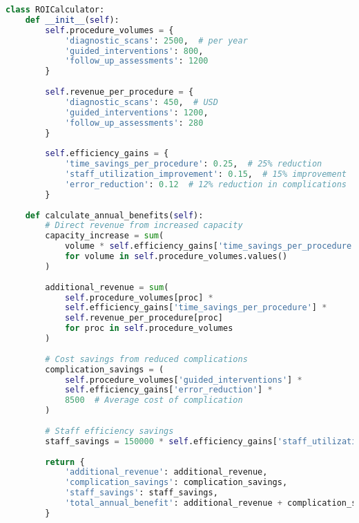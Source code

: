 \begin{lstlisting}[language=Python, caption={ROI Calculation Model}, label={lst:roi-calculation}]
class ROICalculator:
    def __init__(self):
        self.procedure_volumes = {
            'diagnostic_scans': 2500,  # per year
            'guided_interventions': 800,
            'follow_up_assessments': 1200
        }
        
        self.revenue_per_procedure = {
            'diagnostic_scans': 450,  # USD
            'guided_interventions': 1200,
            'follow_up_assessments': 280
        }
        
        self.efficiency_gains = {
            'time_savings_per_procedure': 0.25,  # 25% reduction
            'staff_utilization_improvement': 0.15,  # 15% improvement
            'error_reduction': 0.12  # 12% reduction in complications
        }
    
    def calculate_annual_benefits(self):
        # Direct revenue from increased capacity
        capacity_increase = sum(
            volume * self.efficiency_gains['time_savings_per_procedure']
            for volume in self.procedure_volumes.values()
        )
        
        additional_revenue = sum(
            self.procedure_volumes[proc] * 
            self.efficiency_gains['time_savings_per_procedure'] *
            self.revenue_per_procedure[proc]
            for proc in self.procedure_volumes
        )
        
        # Cost savings from reduced complications
        complication_savings = (
            self.procedure_volumes['guided_interventions'] *
            self.efficiency_gains['error_reduction'] *
            8500  # Average cost of complication
        )
        
        # Staff efficiency savings
        staff_savings = 150000 * self.efficiency_gains['staff_utilization_improvement']
        
        return {
            'additional_revenue': additional_revenue,
            'complication_savings': complication_savings,
            'staff_savings': staff_savings,
            'total_annual_benefit': additional_revenue + complication_savings + staff_savings
        }
\end{lstlisting}

